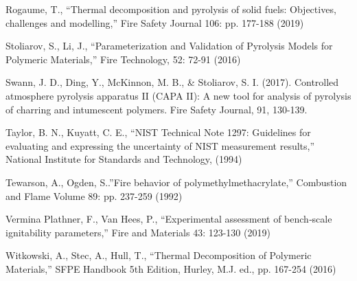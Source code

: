 \documentclass{book}
\begin{document}
Rogaume, T., “Thermal decomposition and pyrolysis of solid fuels: Objectives, challenges and modelling,” Fire Safety Journal 106: pp. 177-188 (2019)

Stoliarov, S., Li, J., “Parameterization and Validation of Pyrolysis Models for Polymeric Materials,” Fire Technology, 52: 72-91 (2016)

Swann, J. D., Ding, Y., McKinnon, M. B., \& Stoliarov, S. I. (2017). Controlled atmosphere pyrolysis apparatus II (CAPA II): A new tool for analysis of pyrolysis of charring and intumescent polymers. Fire Safety Journal, 91, 130-139.

Taylor, B. N., Kuyatt, C. E., “NIST Technical Note 1297: Guidelines for evaluating and expressing the uncertainty of NIST measurement results,” National Institute for Standards and Technology, (1994)

Tewarson, A., Ogden, S..”Fire behavior of polymethylmethacrylate,” Combustion and Flame Volume 89: pp. 237-259 (1992)

Vermina Plathner, F., Van Hees, P., “Experimental assessment of bench‐scale ignitability parameters,” Fire and Materials 43: 123-130 (2019)


Witkowski, A., Stec, A., Hull, T., “Thermal Decomposition of Polymeric Materials,” SFPE Handbook 5th Edition, Hurley, M.J. ed., pp. 167-254 (2016)
\end{document}
